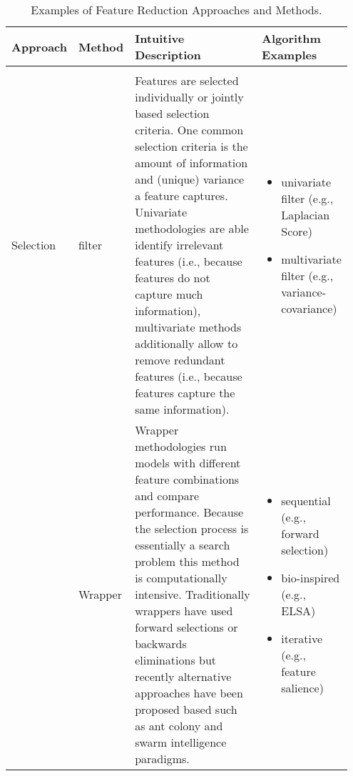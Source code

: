 \begin{sidewaystable*}[!hbtp]
    \centering
    \caption{Examples of Feature Reduction Approaches and Methods.}
    \label{tab:featureReduction} 
    \begin{tabular}{
    >{\raggedright\arraybackslash}p{0.08\linewidth} 
    >{\raggedright\arraybackslash}p{0.08\linewidth} 
    >{\raggedright\arraybackslash}p{0.54\linewidth} 
    >{\raggedright\arraybackslash}p{0.25\linewidth}
    }
        \hline 
        Approach & Method & Intuitive Description & Algorithm Examples \\ 
        \hline \\ [-0.5em]
        
        Selection \linebreak & 
        filter \linebreak & 
        Features are selected individually or jointly based selection criteria. One common selection criteria is the amount of information and (unique) variance a feature captures. Univariate methodologies are able identify irrelevant features (i.e., because features do not capture much information), multivariate methods additionally allow to remove redundant features (i.e., because features capture the same information). \linebreak &
        \vspace{-1em}
        \begin{itemize}[nosep,leftmargin=*,label={--}]
            \item univariate filter (e.g., Laplacian Score)
            \item multivariate filter (e.g., variance-covariance)
        \end{itemize}
         \linebreak \\ 
        
        \linebreak & 
        Wrapper \linebreak & 
        Wrapper methodologies run models with different feature combinations and compare performance. Because the selection process is essentially a search problem this method is computationally intensive. Traditionally wrappers have used forward selections or backwards eliminations but recently alternative approaches have been proposed based such as ant colony and swarm intelligence paradigms. \linebreak &
        \vspace{-1em}
        \begin{itemize}[nosep,leftmargin=*,label={--}]
            \item sequential (e.g., forward selection)
            \item bio-inspired (e.g., ELSA)
            \item iterative (e.g., feature salience)
        \end{itemize}
         \linebreak \\ 
        

\end{tabular}
\end{sidewaystable*}
